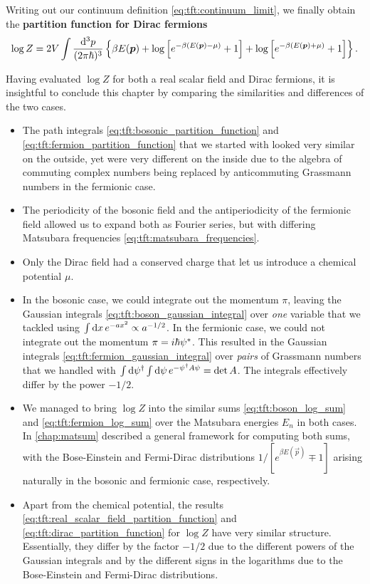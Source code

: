 Writing out our continuum definition \eqref{eq:tft:continuum_limit}, we finally obtain the \textbf{partition function for Dirac fermions}
\begin{equation}
	\log Z = 2 V \int \frac{\mathop{}\!\mathrm{d}^3 p}{(2 \pi \hbar)^3} \left\{ \beta E({\bm{p}}) + \log \left[ e^{-\beta (E({\bm{p}}) - \mu)}+1 \right] + \log \left[ e^{-\beta (E({\bm{p}}) + \mu)} + 1\right] \right\} .
\label{eq:tft:dirac_partition_function}
\end{equation}

Having evaluated $\log Z$ for both a real scalar field and Dirac fermions, it is insightful to conclude this chapter by comparing the similarities and differences of the two cases.
\begin{itemize}
\item The path integrals \eqref{eq:tft:bosonic_partition_function} and \eqref{eq:tft:fermion_partition_function} that we started with looked very similar on the outside, yet were very different on the inside due to the algebra of commuting complex numbers being replaced by anticommuting Grassmann numbers in the fermionic case.
\item The periodicity of the bosonic field and the antiperiodicity of the fermionic field allowed us to expand both as Fourier series, but with differing Matsubara frequencies \eqref{eq:tft:matsubara_frequencies}.
\item Only the Dirac field had a conserved charge that let us introduce a chemical potential $\mu$.
\item In the bosonic case, we could integrate out the momentum $\pi$, leaving the Gaussian integrals \eqref{eq:tft:boson_gaussian_integral} over \emph{one} variable that we tackled using $\int \mathop{}\!\mathrm{d} x \, e^{-ax^2} \propto a^{-1/2}$.
      In the fermionic case, we could not integrate out the momentum $\pi = i \hbar {\psi}^*$.
      This resulted in the Gaussian integrals \eqref{eq:tft:fermion_gaussian_integral} over \emph{pairs} of Grassmann numbers that we handled with $\int \mathop{}\!\mathrm{d} \psi^\dagger \int \mathop{}\!\mathrm{d} \psi \, e^{-\psi^\dagger A \psi} = \operatorname{det} A$.
	  The integrals effectively differ by the power $-1/2$.
\item We managed to bring $\log Z$ into the similar sums \eqref{eq:tft:boson_log_sum} and \eqref{eq:tft:fermion_log_sum} over the Matsubara energies $E_n$ in both cases.
      In \cref{chap:matsum} described a general framework for computing both sums, with the Bose-Einstein and Fermi-Dirac distributions $1 / [e^{\beta E(\vec{p})} \mp 1]$ arising naturally in the bosonic and fermionic case, respectively.
\item Apart from the chemical potential, the results \eqref{eq:tft:real_scalar_field_partition_function} and \eqref{eq:tft:dirac_partition_function} for $\log Z$ have very similar structure.
      Essentially, they differ by the factor $-1/2$ due to the different powers of the Gaussian integrals and by the different signs in the logarithms due to the Bose-Einstein and Fermi-Dirac distributions.
\end{itemize}





